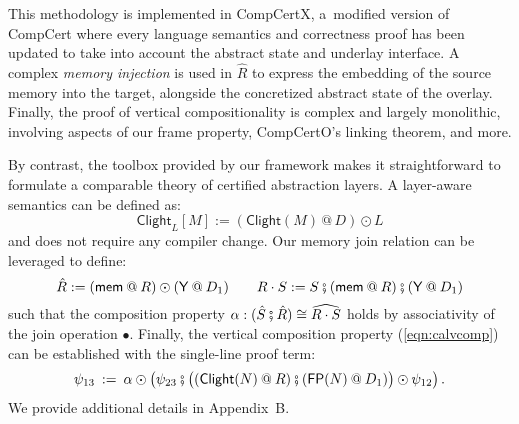 \documentclass[acmsmall,screen,review,anonymous,nonacm]{acmart}
\newcommand{\kw}[1]{\ensuremath{ \mathsf{#1} }}
\newcommand{\jr}{\mathsf{Y}}
\newcommand{\vcomp}{\fatsemi}
\begin{document}
This methodology is implemented in CompCertX,
a~modified version of CompCert where
every language semantics and correctness proof
has been updated
to take into account the abstract state and underlay interface.
A complex \emph{memory injection} is used in $\hat{R}$
to express the embedding of the source memory into the target,
alongside the concretized abstract state of the overlay.
Finally, the proof of vertical compositionality
is complex and largely monolithic,
involving aspects of
our frame property,
CompCertO's linking theorem, and more.

By contrast,
the toolbox provided by our framework
makes it straightforward to formulate a comparable theory
of certified abstraction layers.
A layer-aware semantics can be defined as:
\[
  \kw{Clight}_L[M] := (\kw{Clight}(M) \mathbin@ D) \odot L
\]
and does not require any compiler change.
Our memory join relation can be leveraged to define:
\[
  \hat{R} := 
    (\kw{mem} \mathbin@ R) \odot (\jr \mathbin@ D_1)
  \qquad
  R \cdot S :=
    S \vcomp (\kw{mem} \mathbin@ R) \vcomp (\jr \mathbin@ D_1)
\]
such that the composition property
$\alpha : (\hat{S} \vcomp \hat{R}) \cong \widehat{R \cdot S}$
holds by associativity of the join operation $\bullet$.
Finally,
the vertical composition property (\ref{eqn:calvcomp})
can be established with the single-line proof term:
\[
  \psi_{13} \: := \:
    \alpha \odot \big(
    \psi_{23} \vcomp
    \big( (\kw{Clight}(N) \mathbin@ R) \vcomp
          (\kw{FP}(N) \mathbin@ D_1) \big) \odot \psi_{12} \big)
  \,.
\]
We provide additional details in Appendix~B. %
\end{document}
